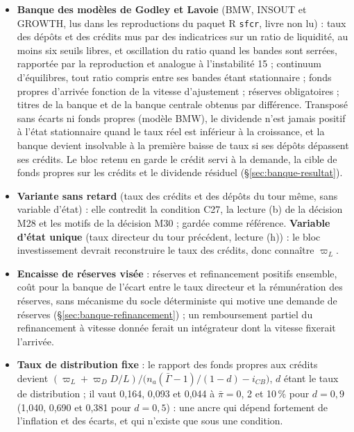 \documentclass[11pt,a4paper]{article}
\begin{document}
\begin{itemize}
\item \textbf{Banque des modèles de Godley et Lavoie} (BMW, INSOUT et GROWTH, lus dans les reproductions du paquet R \texttt{sfcr}, livre non lu) : taux des dépôts et des crédits mus par des indicatrices sur un ratio de liquidité, au moins six seuils libres, et oscillation du ratio quand les bandes sont serrées, rapportée par la reproduction et analogue à l'instabilité 15 ; continuum d'équilibres, tout ratio compris entre ses bandes étant stationnaire ; fonds propres d'arrivée fonction de la vitesse d'ajustement ; réserves obligatoires ; titres de la banque et de la banque centrale obtenus par différence. Transposé sans écarts ni fonds propres (modèle BMW), le dividende n'est jamais positif à l'état stationnaire quand le taux réel est inférieur à la croissance, et la banque devient insolvable à la première baisse de taux si ses dépôts dépassent ses crédits. Le bloc retenu en garde le crédit servi à la demande, la cible de fonds propres sur les crédits et le dividende résiduel (\S\ref{sec:banque-resultat}).
\item \textbf{Variante sans retard} (taux des crédits et des dépôts du tour même, sans variable d'état) : elle contredit la condition C27, la lecture (b) de la décision M28 et les motifs de la décision M30 ; gardée comme référence. \textbf{Variable d'état unique} (taux directeur du tour précédent, lecture (h)) : le bloc investissement devrait reconstruire le taux des crédits, donc connaître $\varpi_L$.
\item \textbf{Encaisse de réserves visée} : réserves et refinancement positifs ensemble, coût pour la banque de l'écart entre le taux directeur et la rémunération des réserves, sans mécanisme du socle déterministe qui motive une demande de réserves (\S\ref{sec:banque-refinancement}) ; un remboursement partiel du refinancement à vitesse donnée ferait un intégrateur dont la vitesse fixerait l'arrivée.
\item \textbf{Taux de distribution fixe} : le rapport des fonds propres aux crédits devient $(\varpi_L + \varpi_D D/L)/\bigl(n_a(\bar\Gamma - 1)/(1 - d) - i_{\mathit{CB}}\bigr)$, $d$ étant le taux de distribution ; il vaut 0,164, 0,093 et 0,044 à $\bar\pi = 0$, 2 et 10\,\% pour $d = 0{,}9$ (1,040, 0,690 et 0,381 pour $d = 0{,}5$) : une ancre qui dépend fortement de l'inflation et des écarts, et qui n'existe que sous une condition.

\end{itemize}
\end{document}
